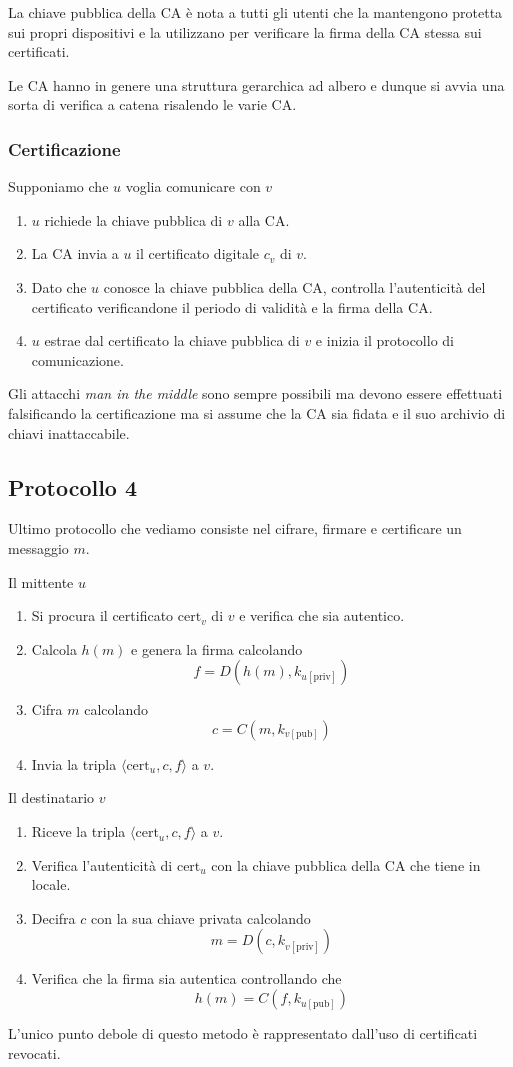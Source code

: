 La chiave pubblica della CA \`e nota a tutti gli utenti che la mantengono protetta sui propri dispositivi e la
utilizzano per verificare la firma della CA stessa sui certificati.

Le CA hanno in genere una struttura gerarchica ad albero e dunque si avvia una sorta di verifica a catena risalendo
le varie CA.

\subsubsection{Certificazione}
Supponiamo che $u$ voglia comunicare con $v$
\begin{enumerate}
	\item $u$ richiede la chiave pubblica di $v$ alla CA.
	\item La CA invia a $u$ il certificato digitale $c_v$ di $v$.
	\item Dato che $u$ conosce la chiave pubblica della CA, controlla l'autenticit\`a del certificato verificandone il
	      periodo di validit\`a e la firma della CA.
	\item $u$ estrae dal certificato la chiave pubblica di $v$ e inizia il protocollo di comunicazione.
\end{enumerate}
Gli attacchi \emph{man in the middle} sono sempre possibili ma devono essere effettuati falsificando la certificazione
ma si assume che la CA sia fidata e il suo archivio di chiavi inattaccabile.

\subsection{Protocollo 4}
Ultimo protocollo che vediamo consiste nel cifrare, firmare e certificare un messaggio $m$.

Il mittente $u$
\begin{enumerate}
	\item Si procura il certificato $\text{cert}_v$ di $v$ e verifica che sia autentico.
	\item Calcola $h(m)$ e genera la firma calcolando
	      \[ f = D(h(m), k_{u [\text{priv}]}) \]
	\item Cifra $m$ calcolando
	      \[ c = C(m, k_{v [\text{pub}]}) \]
	\item Invia la tripla $\langle \text{cert}_u, c, f \rangle$ a $v$.
\end{enumerate}
Il destinatario $v$
\begin{enumerate}
	\item Riceve la tripla $\langle \text{cert}_u, c, f \rangle$ a $v$.
	\item Verifica l'autenticit\`a di $\text{cert}_u$ con la chiave pubblica della CA che tiene in locale.
	\item Decifra $c$ con la sua chiave privata calcolando
	      \[ m = D(c, k_{v [\text{priv}]}) \]
	\item Verifica che la firma sia autentica controllando che
	      \[ h(m) = C(f, k_{u [\text{pub}]}) \]
\end{enumerate}
L'unico punto debole di questo metodo \`e rappresentato dall'uso di certificati revocati.